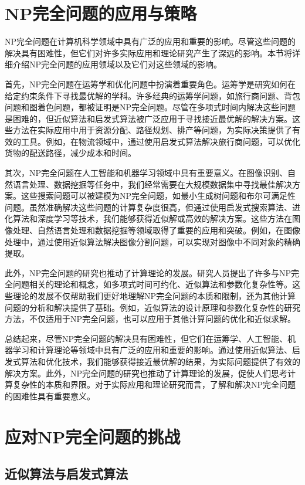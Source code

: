 \documentclass[UTF8,openany,zihao=5]{ctexbook}
\begin{document}
\chapter{NP完全问题的应用与策略}

NP完全问题在计算机科学领域中具有广泛的应用和重要的影响。尽管这些问题的解决具有困难性，但它们对许多实际应用和理论研究产生了深远的影响。本节将详细介绍NP完全问题的应用领域以及它们对这些领域的影响。

首先，NP完全问题在运筹学和优化问题中扮演着重要角色。运筹学是研究如何在给定约束条件下寻找最优解的学科。许多经典的运筹学问题，如旅行商问题、背包问题和图着色问题，都被证明是NP完全问题。尽管在多项式时间内解决这些问题是困难的，但近似算法和启发式算法被广泛应用于寻找接近最优解的解决方案。这些方法在实际应用中用于资源分配、路径规划、排产等问题，为实际决策提供了有效的工具。例如，在物流领域中，通过使用启发式算法解决旅行商问题，可以优化货物的配送路径，减少成本和时间。

其次，NP完全问题在人工智能和机器学习领域中具有重要意义。在图像识别、自然语言处理、数据挖掘等任务中，我们经常需要在大规模数据集中寻找最佳解决方案。这些搜索问题可以被建模为NP完全问题，如最小生成树问题和布尔可满足性问题。虽然准确解决这些问题的计算复杂度很高，但通过使用启发式搜索算法、进化算法和深度学习等技术，我们能够获得近似解或高效的解决方案。这些方法在图像处理、自然语言处理和数据挖掘等领域取得了重要的应用和突破\cite{bi:PAL}。例如，在图像处理中，通过使用近似算法解决图像分割问题，可以实现对图像中不同对象的精确提取。

此外，NP完全问题的研究也推动了计算理论的发展\cite{bi:BK}。研究人员提出了许多与NP完全问题相关的理论和概念，如多项式时间可约化、近似算法和参数化复杂性等。这些理论的发展不仅帮助我们更好地理解NP完全问题的本质和限制，还为其他计算问题的分析和解决提供了基础。例如，近似算法的设计原理和参数化复杂性的研究方法，不仅适用于NP完全问题，也可以应用于其他计算问题的优化和近似求解。

总结起来，尽管NP完全问题的解决具有困难性，但它们在运筹学、人工智能、机器学习和计算理论等领域中具有广泛的应用和重要的影响。通过使用近似算法、启发式算法和优化技术，我们能够获得接近最优解的结果，为实际问题提供了有效的解决方案。此外，NP完全问题的研究也推动了计算理论的发展，促使人们思考计算复杂性的本质和界限。对于实际应用和理论研究而言，了解和解决NP完全问题的困难性具有重要意义。

\chapter{应对NP完全问题的挑战}

\section{近似算法与启发式算法}
\end{document}
